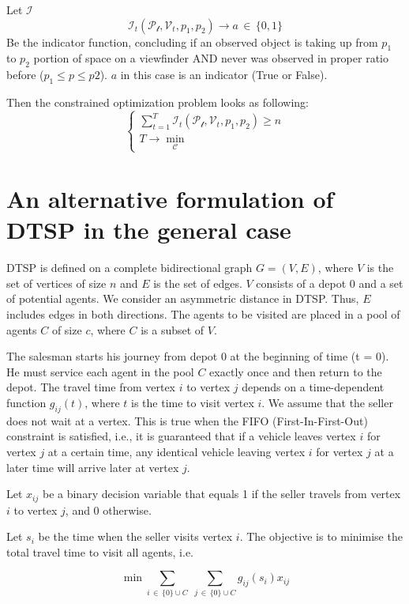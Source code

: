 Let $\mathcal{I}$ 
$$
\mathcal{I}_{t}(\mathcal{P_{t}}, \mathcal{V}_{t}, p_{1}, p_{2}) \to a \, \in \, \{ 0,1 \}
$$
Be the indicator function, concluding if an observed object is taking up from $p_{1}$ to $p_{2}$ portion of space on a viewfinder AND never was observed in proper ratio before ($p_{1} \leq p \leq p2$). $a$ in this case is an indicator (True or False).

Then the constrained optimization problem looks as following:
$$
\begin{cases}
\sum\limits_{t=1}^{T} \mathcal{I}_{t}(\mathcal{P_{t}}, \mathcal{V}_{t}, p_{1}, p_{2}) \geq n \\
T \to \min\limits_{\mathcal{C}}
\end{cases}
$$



\section{An alternative formulation of DTSP in the general case}
DTSP is defined on a complete bidirectional graph $ G = (V, E) $, where $ V $ is the set of vertices of size $ n $ and $ E $ is the set of edges. $ V $ consists of a depot 0 and a set of potential agents. We consider an asymmetric distance in DTSP. Thus, $ E $ includes edges in both directions. The agents to be visited are placed in a pool of agents $ C $ of size $ c $, where $ C $ is a subset of $ V $.

The salesman starts his journey from depot 0 at the beginning of time (t = 0). He must service each agent in the pool $ C $ exactly once and then return to the depot. The travel time from vertex $ i $ to vertex $ j $ depends on a time-dependent function $ g_{ij} (t) $, where $ t $ is the time to visit vertex $ i $. We assume that the seller does not wait at a vertex. This is true when the FIFO (First-In-First-Out) constraint is satisfied, i.e., it is guaranteed that if a vehicle leaves vertex $ i $ for vertex $ j $ at a certain time, any identical vehicle leaving vertex $ i $ for vertex $ j $ at a later time will arrive later at vertex $ j $.

Let $ x_{ij} $ be a binary decision variable that equals 1 if the seller travels from vertex $ i $ to vertex $ j $, and 0 otherwise.

Let $ s_i $ be the time when the seller visits vertex $ i $. The objective is to minimise the total travel time to visit all agents, i.e.

$$
\min_{}\sum_{i\, \in\, \{ 0 \}\cup C}\;\sum_{j\, \in\, \{ 0 \}\cup C} g_{ij}(s_{i})x_{ij}
$$

